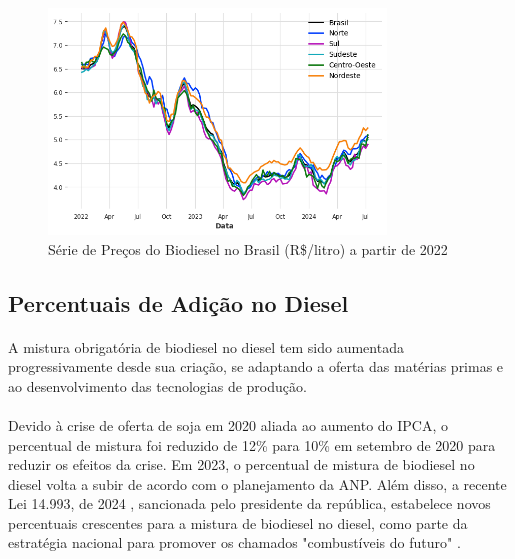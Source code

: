 \begin{figure}
	\begin{center}
		\parbox[htb]{13.0cm}
		{
			\begin{center}
				\includegraphics[width=0.8\textwidth]{figuras/biodiesel_price.png}
				\caption{Série de Preços do Biodiesel no Brasil (R\$/litro) a partir de 2022}
				\label{fig:biodiesel_price}
			\end{center}
		}
	\end{center}
\end{figure}

\subsection{Percentuais de Adição no Diesel}

\paragraph{} A mistura obrigatória de biodiesel no diesel tem sido aumentada progressivamente desde sua criação, se adaptando a oferta das matérias primas e ao desenvolvimento das tecnologias de produção.
\paragraph{} Devido à crise de oferta de soja em 2020 aliada ao aumento do \ac{IPCA}, o percentual de mistura foi reduzido de 12\% para 10\% em setembro de 2020 para reduzir os efeitos da crise. Em 2023, o percentual de mistura de biodiesel no diesel volta a subir \cite{g12020} de acordo com o planejamento da \ac{ANP}. Além disso, a recente Lei 14.993, de 2024 \cite{lei14993}, sancionada pelo presidente da república, estabelece novos percentuais crescentes para a mistura de biodiesel no diesel, como parte da estratégia nacional para promover os chamados "combustíveis do futuro" \cite{senadonoticias}. 
